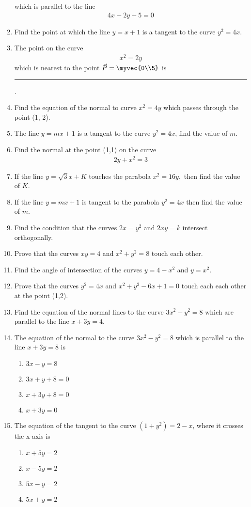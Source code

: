 \begin{enumerate}[label=\thesubsection.\arabic*,ref=\thesubsection.\theenumi]
which is parallel to the line
\begin{align}
	4x-2y+5 = 0
\end{align}
\item 
Find the point at which the line $y = x + 1$ is a tangent to the curve $y^2 = 4x$.
    \item The point on the curve 
\label{chapters/12/6/5/27}
    \begin{align}
        x^2 = 2y
        \label{eq:chapters/12/6/5/27/curve}
    \end{align}
    which is nearest to the point 
    $\vec{P} = \myvec{0\\5}$ is \rule{1cm}{0.1pt}.
    \\
    \solution 

\item 
Find the equation of the normal to curve $x^2 = 4y$ which passes through the point
(1, 2).
\\
\solution 
\label{chapters/12/6/6/4}

\item 
 The line $y=mx+1$ is a tangent to the curve $y^2 = 4x$, find the value of $m$. 
\item 
\label{chapters/12/6/6/22}
Find the normal at the point (1,1) on the curve 
\begin{align}
2y+x^2=3
\end{align}
 \item If the line $y=\sqrt{3}x+K$ touches the parabola $x^2=16y,$ then find the value of $K$.
\item If the line $y=mx+1$ is tangent to the parabola $y^2=4x$ then find the value of $m$.
\item Find the condition that the curves $2x=y^2$ and $2xy=k$ intersect orthogonally.
\item Prove that the curves $xy=4$ and $x^2+y^2=8$ touch each other.
\item Find the angle of intersection of the curves $y=4-x^2$ and $y=x^2$.
\item Prove that the curves $y^2=4x$ and $x^2+y^2-6x+1=0$ touch each each other at the point (1,2).
\item Find the equation of the normal lines to the curve $3x^2-y^2=8$ which are parallel to the line $x+3y=4$.
 \item The equation of the normal to the curve $3x^2-y^2 =8$ which is parallel to the line $x+3y=8$ is
 \begin{enumerate}
 \item $3x-y=8$
 \item $3x+y+8=0$
 \item $x+3y+8=0$
 \item $x+3y=0$
 \end{enumerate}
\item The equation of the tangent to the curve $(1+y^2) =2-x$, where it crosses the x-axis is 
\begin{enumerate}
\item $x+5y=2$
\item $x-5y=2$
\item $5x-y=2$
\item $5x+y=2$
\end{enumerate}
\end{enumerate}
